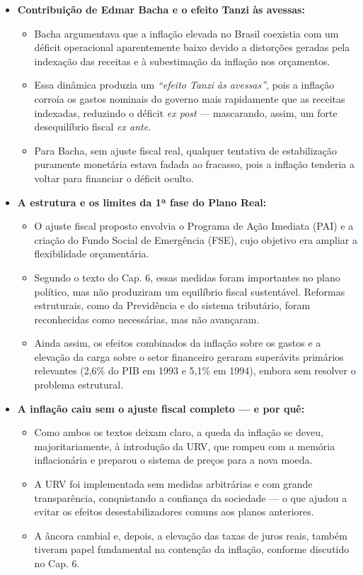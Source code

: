 \documentclass[a4paper,12pt]{article}[abntex2]
\begin{document}
\begin{itemize}

    \item \textbf{Contribuição de Edmar Bacha e o efeito Tanzi às avessas:}
    \begin{itemize}
        \item Bacha argumentava que a inflação elevada no Brasil coexistia com um déficit operacional aparentemente baixo devido a distorções geradas pela indexação das receitas e à subestimação da inflação nos orçamentos.
        \item Essa dinâmica produzia um \textit{“efeito Tanzi às avessas”}, pois a inflação corroía os gastos nominais do governo mais rapidamente que as receitas indexadas, reduzindo o déficit \textit{ex post} — mascarando, assim, um forte desequilíbrio fiscal \textit{ex ante}.
        \item Para Bacha, sem ajuste fiscal real, qualquer tentativa de estabilização puramente monetária estava fadada ao fracasso, pois a inflação tenderia a voltar para financiar o déficit oculto.
    \end{itemize}

    \item \textbf{A estrutura e os limites da 1ª fase do Plano Real:}
    \begin{itemize}
        \item O ajuste fiscal proposto envolvia o Programa de Ação Imediata (PAI) e a criação do Fundo Social de Emergência (FSE), cujo objetivo era ampliar a flexibilidade orçamentária.
        \item Segundo o texto do Cap. 6, essas medidas foram importantes no plano político, mas não produziram um equilíbrio fiscal sustentável. Reformas estruturais, como da Previdência e do sistema tributário, foram reconhecidas como necessárias, mas não avançaram.
        \item Ainda assim, os efeitos combinados da inflação sobre os gastos e a elevação da carga sobre o setor financeiro geraram superávits primários relevantes (2,6\% do PIB em 1993 e 5,1\% em 1994), embora sem resolver o problema estrutural.
    \end{itemize}

    \item \textbf{A inflação caiu sem o ajuste fiscal completo — e por quê:}
    \begin{itemize}
        \item Como ambos os textos deixam claro, a queda da inflação se deveu, majoritariamente, à introdução da URV, que rompeu com a memória inflacionária e preparou o sistema de preços para a nova moeda.
        \item A URV foi implementada sem medidas arbitrárias e com grande transparência, conquistando a confiança da sociedade — o que ajudou a evitar os efeitos desestabilizadores comuns aos planos anteriores.
        \item A âncora cambial e, depois, a elevação das taxas de juros reais, também tiveram papel fundamental na contenção da inflação, conforme discutido no Cap. 6.
    \end{itemize}


\end{itemize}
\end{document}
